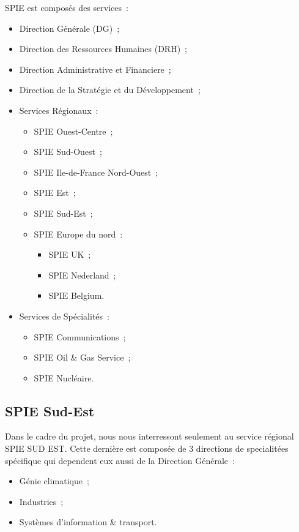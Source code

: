 SPIE est compos\'es des services~:

\begin{itemize}
    \item Direction G\'en\'erale (DG)~;
    \item Direction des Ressources Humaines (DRH)~;
    \item Direction Administrative et Financiere~;
    \item Direction de la Strat\'egie et du D\'eveloppement~;
    \item Services R\'egionaux~:
    \begin{itemize}
        \item SPIE Ouest-Centre~;
        \item SPIE Sud-Ouest~;
        \item SPIE Ile-de-France Nord-Ouest~;
        \item SPIE Est~;
        \item SPIE Sud-Est~;
        \item SPIE Europe du nord~:
        \begin{itemize}
            \item SPIE UK~;
            \item SPIE Nederland~;
            \item SPIE Belgium.
        \end{itemize}
    \end{itemize}
    \item Services de Sp\'ecialit\'es~:
    \begin{itemize}
        \item SPIE Communications~;
        \item SPIE Oil \& Gas Service~;
        \item SPIE Nucl\'eaire.
    \end{itemize}
\end{itemize}

\subsection{SPIE Sud-Est}

Dans le cadre du projet, nous nous interressont seulement au service r\'egional SPIE SUD EST. Cette derni\`ere
est compos\'ee de 3 directions de specialit\'ees sp\'ecifique qui dependent eux aussi de la Direction G\'en\'erale~:

\begin{itemize}
    \item G\'enie climatique~;
    \item Industries~;
    \item Syst\`emes d’information \& transport.
\end{itemize}

